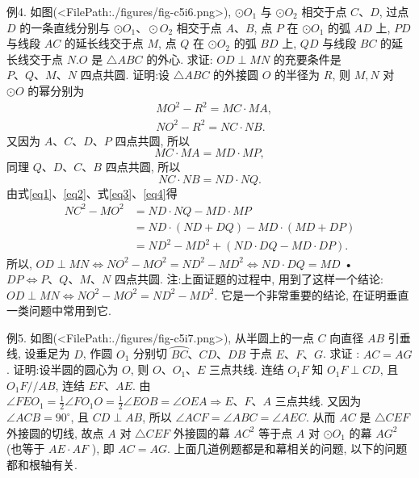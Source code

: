 例4. 如图(<FilePath:./figures/fig-c5i6.png>), $\odot O_1$ 与 $\odot O_2$ 相交于点 $C 、 D$, 过点 $D$ 的一条直线分别与 $\odot O_1 、 \odot O_2$ 相交于点 $A 、 B$, 点 $P$ 在 $\odot O_1$ 的弧 $A D$ 上, $P D$ 与线段 $A C$ 的延长线交于点 $M$, 点 $Q$ 在 $\odot O_2$ 的弧 $B D$ 上, $Q D$ 与线段 $B C$ 的延长线交于点 $N . O$ 是 $\triangle A B C$ 的外心.
求证: $O D \perp M N$ 的充要条件是 $P 、 Q 、 M 、 N$ 四点共圆.
证明:设 $\triangle A B C$ 的外接圆 $O$ 的半径为 $R$, 则 $M, N$ 对 $\odot O$ 的幂分别为
$$
\begin{aligned}
& M O^2-R^2=M C \cdot M A, \label{eq1} \\
& N O^2-R^2=N C \cdot N B . \label{eq2}
\end{aligned}
$$
又因为 $A 、 C 、 D 、 P$ 四点共圆, 所以
$$
M C \cdot M A=M D \cdot M P, \label{eq3}
$$
同理 $Q 、 D 、 C 、 B$ 四点共圆, 所以
$$
N C \cdot N B=N D \cdot N Q . \label{eq4}
$$
由式\ref{eq1}、\ref{eq2}、式\ref{eq3}、\ref{eq4}得
$$
\begin{aligned}
N C^2-M O^2 & =N D \cdot N Q-M D \cdot M P \\
& =N D \cdot(N D+D Q)-M D \cdot(M D+D P) \\
& =N D^2-M D^2+(N D \cdot D Q-M D \cdot D P) .
\end{aligned}
$$
所以, $O D \perp M N \Leftrightarrow N O^2-M O^2=N D^2-M D^2 \Leftrightarrow N D \cdot D Q=M D$ • $D P \Leftrightarrow P 、 Q 、 M 、 N$ 四点共圆.
注:上面证题的过程中, 用到了这样一个结论: $O D \perp M N \Leftrightarrow N O^2- M O^2=N D^2-M D^2$. 它是一个非常重要的结论, 在证明垂直一类问题中常用到它.



例5. 如图(<FilePath:./figures/fig-c5i7.png>), 从半圆上的一点 $C$ 向直径 $A B$ 引垂线, 设垂足为 $D$, 作圆 $O_1$ 分别切 $\overparen{B C} 、 C D 、 D B$ 于点 $E 、 F 、 G$. 求证 : $A C=A G$.
证明:设半圆的圆心为 $O$, 则 $O 、 O_1 、 E$ 三点共线.
连结 $O_1 F$ 知 $O_1 F \perp C D$, 且 $O_1 F / / A B$, 连结 $E F 、 A E$.
由 $\angle F E O_1=\frac{1}{2} \angle F O_1 O=\frac{1}{2} \angle E O B=\angle O E A \Rightarrow E 、 F 、 A$ 三点共线.
又因为 $\angle A C B=90^{\circ}$, 且 $C D \perp A B$, 所以 $\angle A C F=\angle A B C=\angle A E C$.
从而 $A C$ 是 $\triangle C E F$ 外接圆的切线, 故点 $A$ 对 $\triangle C E F$ 外接圆的幕 $A C^2$ 等于点 $A$ 对 $\odot O_1$ 的幕 $A G^2$ (也等于 $A E \cdot A F$ ), 即 $A C=A G$.
上面几道例题都是和幕相关的问题, 以下的问题都和根轴有关.



